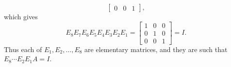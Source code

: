 \begin{solution}
\begin{equation*}
\begin{bmatrix}
      0 & 0 & 1
    \end{bmatrix},
  \end{equation*}
  which gives
  \begin{equation*}
    E_8E_7E_6E_5E_4E_3E_2E_1 =
    \begin{bmatrix}
      1 & 0 & 0 \\
      0 & 1 & 0 \\
      0 & 0 & 1
    \end{bmatrix}
    = I.
  \end{equation*}
  Thus each of $E_1,E_2,\dots,E_8$ are elementary matrices, and they
  are such that $E_8\cdots E_2E_1A = I$.
\end{solution}
